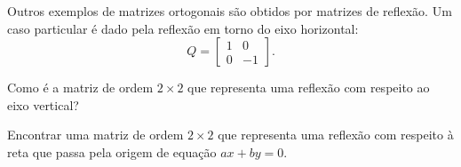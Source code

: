 

Outros exemplos de matrizes ortogonais são obtidos por matrizes de reflexão. Um caso particular é dado pela reflexão em torno do eixo horizontal:
 \begin{equation}
 Q =
 \begin{bmatrix}
 1 & 0 \\
 0 & -1
 \end{bmatrix}.\end{equation}

 \begin{exer}
Como é a matriz de ordem $2 \times 2$ que representa uma reflexão com respeito ao eixo vertical?
 \end{exer}

 \begin{exer}
Encontrar uma matriz de ordem $2 \times 2$ que representa uma reflexão com respeito à reta que passa pela origem de equação $ax + b y = 0$.
\end{exer}

%







